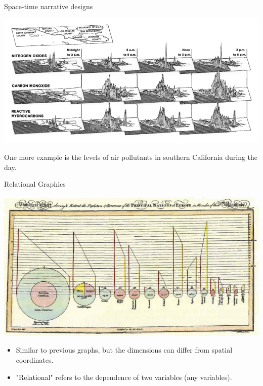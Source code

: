 \documentclass[
  ignorenonframetext,
]{beamer}
\begin{document}
\begin{frame}{Space-time narrative designs}
\label{space-time-narrative-designs-2}
\begin{minipage}{1\textwidth}
\centering
\includegraphics[width=\textwidth]{excellence_figs/fig_23.png}
\end{minipage}
\hfill
\begin{minipage}{1\textwidth}
\footnotesize
\vspace{3mm}
One more example is the levels of air pollutants in southern California during the day.
\end{minipage}
\end{frame}

\begin{frame}{Relational Graphics}
\label{relational-graphics}
\begin{minipage}{1\textwidth}
\centering
\includegraphics[width=\textwidth]{excellence_figs/fig_24.png}
\end{minipage}
\hfill \vspace{3mm}
\begin{minipage}{1\textwidth}
\footnotesize
\begin{itemize}
  \item Similar to previous graphs, but the dimensions can differ from spatial coordinates.
  \item "Relational" refers to the dependence of two variables (any variables).
\end{itemize}
\end{minipage}
\end{frame}
\end{document}
